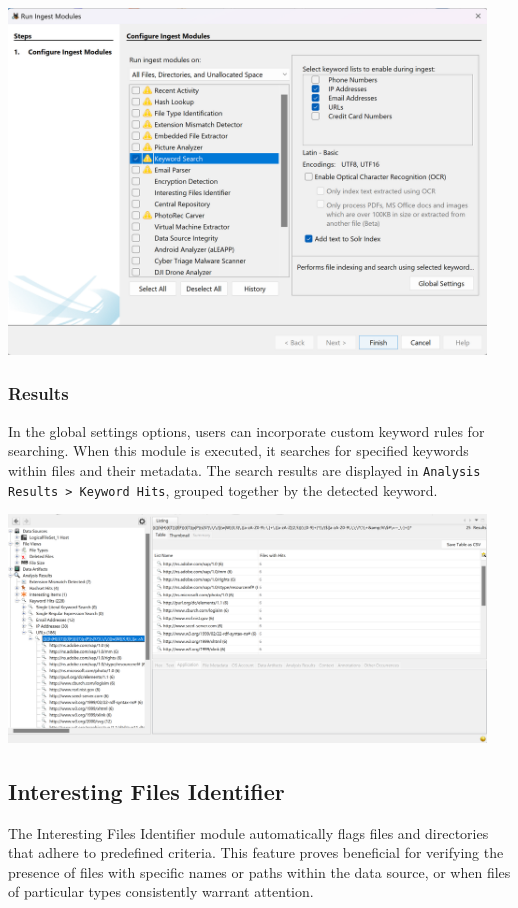 \documentclass{article}
\begin{document}
\begin{center}
    \includegraphics[width=0.95\textwidth]{3/3.7/Keyword Search Settings.png}
\end{center}

\subsubsection*{Results}
In the global settings options, users can incorporate custom keyword rules for searching. When this module is executed, it searches for specified keywords within files and their metadata. The search results are displayed in \texttt{Analysis Results > Keyword Hits}, grouped together by the detected keyword.

\begin{center}
    \includegraphics[width=0.95\textwidth]{3/3.7/Keyword Search Results Details.png}
\end{center}

\subsection{Interesting Files Identifier}
The Interesting Files Identifier module automatically flags files and directories that adhere to predefined criteria. This feature proves beneficial for verifying the presence of files with specific names or paths within the data source, or when files of particular types consistently warrant attention.
\end{document}
